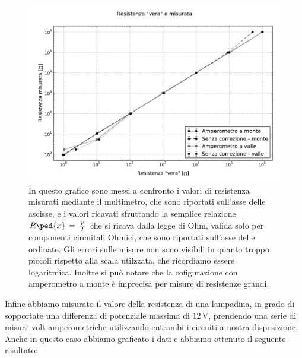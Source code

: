 \begin{figure}
        \centering
        \includegraphics[scale=0.50]{culo.pdf}
        \caption{In questo grafico sono messi a confronto i valori di resistenza misurati mediante il multimetro, che sono riportati sull'asse delle ascisse, e i valori ricavati sfruttando la semplice relazione $R\ped{x} \,=\, \frac{V}{I}$ che si ricava dalla legge di Ohm, valida solo per componenti circuitali Ohmici, che sono riportati sull'asse delle ordinate. Gli errori sulle misure non sono visibili in quanto troppo piccoli rispetto alla scala utilzzata, che ricordiamo essere logaritmica. Inoltre si può notare che la cofigurazione con amperometro a monte è imprecisa per misure di resistenze grandi.}
        \label{fig:culo}
\end{figure}

Infine abbiamo misurato il valore della resistenza di una lampadina, in grado di sopportate una differenza di potenziale massima di $12\,\si{\volt}$, prendendo una serie di misure volt-amperometriche utilizzando entrambi i circuiti a nostra disposizione.
Anche in questo caso abbiamo graficato i dati e abbiamo ottenuto il seguente risultato:

